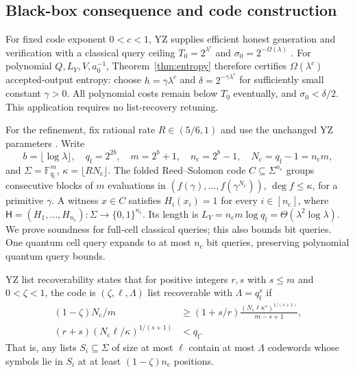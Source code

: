 \documentclass[11pt]{article}
\theoremstyle{definition}\newtheorem{definition}[theorem]{Definition}
\theoremstyle{remark}\newtheorem{remark}[theorem]{Remark}
\begin{document}
\subsection{Black-box consequence and code construction}
For fixed code exponent \(0<c<1\), YZ supplies efficient honest generation and verification with a classical query ceiling \(T_0=2^{\lambda^c}\) and \(\sigma_0=2^{-\Omega(\lambda)}\) \cite[Lemmas~6.3 and~6.9]{YZ24}. For polynomial \(Q,L_Y,V,a_0^{-1}\), Theorem~\ref{thm:entropy} therefore certifies \(\Omega(\lambda^c)\) accepted-output entropy: choose \(h=\gamma\lambda^c\) and \(\delta=2^{-\gamma\lambda^c}\) for sufficiently small constant \(\gamma>0\). All polynomial costs remain below \(T_0\) eventually, and \(\sigma_0<\delta/2\). This application requires no list-recovery retuning.

For the refinement, fix rational rate \(R\in(5/6,1)\) and use the unchanged YZ parameters \cite[Section~4.3.2]{YZ24}. Write
\[
 b=\lfloor\log\lambda\rfloor,\quad q_{\mathrm f}=2^{2b},\quad m=2^b+1,\quad n_{\mathrm c}=2^b-1,\quad N_{\mathrm c}=q_{\mathrm f}-1=n_{\mathrm c}m,
\]
and \(\Sigma=\mathbb F_{q_{\mathrm f}}^m\), \(\kappa=\lfloor RN_{\mathrm c}\rfloor\). The folded Reed--Solomon code \(C\subseteq\Sigma^{n_{\mathrm c}}\) groups consecutive blocks of \(m\) evaluations in \((f(\gamma),\ldots,f(\gamma^{N_{\mathrm c}}))\), \(\deg f\le\kappa\), for a primitive \(\gamma\). A witness \(x\in C\) satisfies \(H_i(x_i)=1\) for every \(i\in[n_{\mathrm c}]\), where \(\mathsf H=(H_1,\ldots,H_{n_{\mathrm c}}):\Sigma\to\{0,1\}^{n_{\mathrm c}}\). Its length is \(L_Y=n_{\mathrm c}m\log q_{\mathrm f}=\Theta(\lambda^2\log\lambda)\). We prove soundness for full-cell classical queries; this also bounds bit queries. One quantum cell query expands to at most \(n_{\mathrm c}\) bit queries, preserving polynomial quantum query bounds.

YZ list recoverability \cite[Lemma~4.3, equations~(8)--(9)]{YZ24} states that for positive integers \(r,s\) with \(s\le m\) and \(0<\zeta<1\), the code is \((\zeta,\ell,\Lambda)\) list recoverable with \(\Lambda=q_{\mathrm f}^s\) if
\begin{align}
 (1-\zeta)N_{\mathrm c}/m&\ge(1+s/r)\frac{(N_{\mathrm c}\ell\kappa^s)^{1/(s+1)}}{m-s+1},\tag{L1}\label{eq:L1}\\
 (r+s)(N_{\mathrm c}\ell/\kappa)^{1/(s+1)}&<q_{\mathrm f}.\tag{L2}\label{eq:L2}
\end{align}
That is, any lists \(S_i\subseteq\Sigma\) of size at most \(\ell\) contain at most \(\Lambda\) codewords whose symbols lie in \(S_i\) at at least \((1-\zeta)n_{\mathrm c}\) positions.
\end{document}
